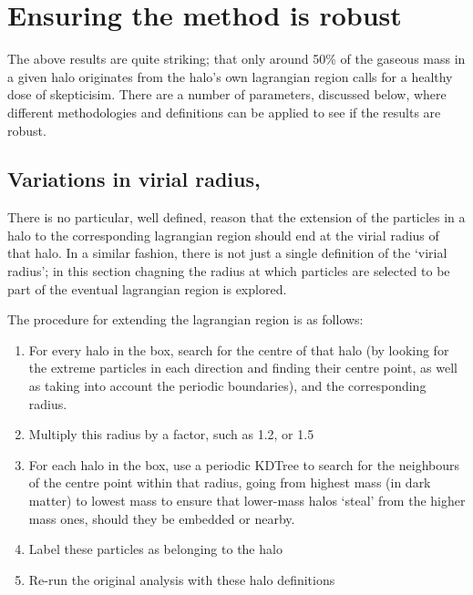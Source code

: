 \section{Ensuring the method is robust}
\label{sec:robustness}

The above results are quite striking; that only around 50\% of the gaseous
mass in a given halo originates from the halo's own lagrangian region calls
for a healthy dose of skepticisim. There are a number of parameters, discussed
below, where different methodologies and definitions can be applied to see
if the results are robust.

\subsection{Variations in virial radius, \rvir{}}

There is no particular, well defined, reason that the extension of the particles
in a halo to the corresponding lagrangian region should end at the virial radius
of that halo. In a similar fashion, there is not just a single definition of the
`virial radius'; in this section chagning the radius at which particles are
selected to be part of the eventual lagrangian region is explored.

The procedure for extending the lagrangian region is as follows:
\begin{enumerate}
    \item For every halo in the box, search for the centre of that halo (by
          looking for the extreme particles in each direction and finding
          their centre point, as well as taking into account the periodic
          boundaries), and the corresponding radius.
    \item Multiply this radius by a factor, such as 1.2, or 1.5
    \item For each halo in the box, use a periodic KDTree to search for the
          neighbours of the centre point within that radius, going from
          highest mass (in dark matter) to lowest mass to ensure that
          lower-mass halos `steal' from the higher mass ones, should they
          be embedded or nearby.
    \item Label these particles as belonging to the halo
    \item Re-run the original analysis with these halo definitions
\end{enumerate}

